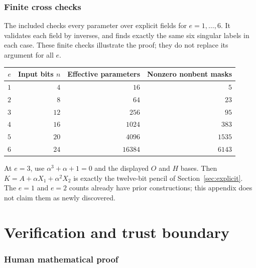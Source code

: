 \documentclass[11pt,a4paper]{article}
\theoremstyle{definition}
\begin{document}
\subsubsection*{Finite cross checks}

The included  checks every parameter over explicit fields for $e=1,\ldots ,6$. It validates each field by inverses, and finds exactly the same six singular labels in each case. These finite checks illustrate the proof; they do not replace its argument for all $e$.


\begin{center}\small\renewcommand{\arraystretch}{1.2}\begin{tabular}{rrrr}\toprule

$e$ & Input bits $n$ & Effective parameters & Nonzero nonbent masks \\
\midrule

$1$ & $4$ & $16$ & $5$ \\

$2$ & $8$ & $64$ & $23$ \\

$3$ & $12$ & $256$ & $95$ \\

$4$ & $16$ & $1024$ & $383$ \\

$5$ & $20$ & $4096$ & $1535$ \\

$6$ & $24$ & $16384$ & $6143$ \\

\bottomrule\end{tabular}\end{center}

At $e=3$, use $\alpha ^{3}+\alpha +1=0$ and the displayed $O$ and $H$ bases. Then $K=A+\alpha X_{1}+\alpha ^{2}X_{2}$ is exactly the twelve-bit pencil of Section~\ref{sec:explicit}. The $e=1$ and $e=2$ counts already have prior constructions; this appendix does not claim them as newly discovered.


\section{Verification and trust boundary}\label{app:C}

\subsubsection*{Human mathematical proof}
\end{document}
